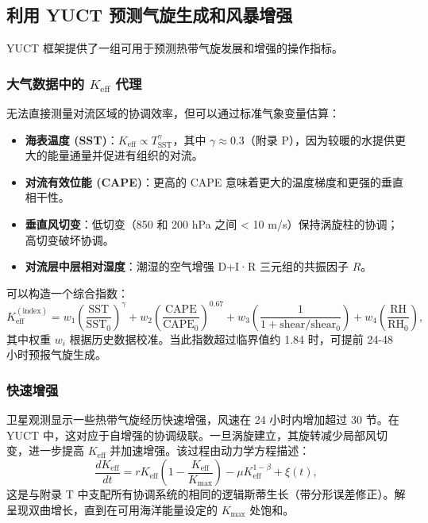 \documentclass[12pt,a4paper]{article}
\newcommand{\Keff}{K_{\mathrm{eff}}}
\begin{document}
	\subsection{利用 YUCT 预测气旋生成和风暴增强}
	\label{subsec:cyclone_prediction}
	
	YUCT 框架提供了一组可用于预测热带气旋发展和增强的操作指标。
	
	\subsubsection*{大气数据中的 \(K_{\mathrm{eff}}\) 代理}
	
	无法直接测量对流区域的协调效率，但可以通过标准气象变量估算：
	\begin{itemize}
		\item \textbf{海表温度 (SST)}：$K_{\mathrm{eff}} \propto T_{\mathrm{SST}}^{\gamma}$，其中 $\gamma \approx 0.3$（附录 P），因为较暖的水提供更大的能量通量并促进有组织的对流。
		\item \textbf{对流有效位能 (CAPE)}：更高的 CAPE 意味着更大的温度梯度和更强的垂直相干性。
		\item \textbf{垂直风切变}：低切变（850 和 200 hPa 之间 < 10 m/s）保持涡旋柱的协调；高切变破坏协调。
		\item \textbf{对流层中层相对湿度}：潮湿的空气增强 D+I·R 三元组的共振因子 $R$。
	\end{itemize}
	可以构造一个综合指数：
	\[
	\Keff^{\mathrm{(index)}} = w_1 \left( \frac{\mathrm{SST}}{\mathrm{SST}_0} \right)^{\gamma}
	+ w_2 \left( \frac{\mathrm{CAPE}}{\mathrm{CAPE}_0} \right)^{0.67}
	+ w_3 \left( \frac{1}{1 + \mathrm{shear}/\mathrm{shear}_0} \right)
	+ w_4 \left( \frac{\mathrm{RH}}{\mathrm{RH}_0} \right),
	\]
	其中权重 $w_i$ 根据历史数据校准。当此指数超过临界值约 1.84 时，可提前 24-48 小时预报气旋生成。
	
	\subsubsection*{快速增强}
	
	卫星观测显示一些热带气旋经历快速增强，风速在 24 小时内增加超过 30 节。在 YUCT 中，这对应于自增强的协调级联。一旦涡旋建立，其旋转减少局部风切变，进一步提高 $\Keff$ 并加速增强。该过程由动力学方程描述：
	\[
	\frac{d\Keff}{dt} = r \Keff \left( 1 - \frac{\Keff}{K_{\max}} \right)
	- \mu \Keff^{1-\beta} + \xi(t),
	\]
	这是与附录 T 中支配所有协调系统的相同的逻辑斯蒂生长（带分形误差修正）。解呈现双曲增长，直到在可用海洋能量设定的 $K_{\max}$ 处饱和。
	
\end{document}
